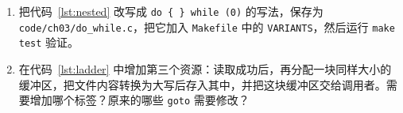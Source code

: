 
\begin{enumerate}
  \item 把代码~\ref{lst:nested} 改写成 \texttt{do \{ \} while (0)} 的写法，保存为 \texttt{code/ch03/do\_while.c}，把它加入 \texttt{Makefile} 中的 \texttt{VARIANTS}，然后运行 \texttt{make test} 验证。
  \item 在代码~\ref{lst:ladder} 中增加第三个资源：读取成功后，再分配一块同样大小的缓冲区，把文件内容转换为大写后存入其中，并把这块缓冲区交给调用者。需要增加哪个标签？原来的哪些 \texttt{goto} 需要修改？
\end{enumerate}
